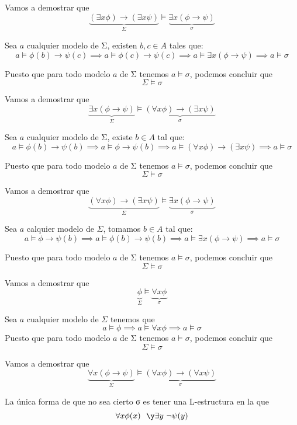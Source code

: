 \begin{problem}
\newpage

\spart
Vamos a demostrar que
\[\underbrace{(\exists x  \phi )\to  (\exists x \psi)}_{Σ} \models  \underbrace{\exists x (\phi \to \psi)}_{σ}\]

Sea $a$ cualquier modelo de Σ, existen $b,c \in A$ tales que:
\[a \models \phi(b) \to \psi(c) \implies a \models \phi(c) \to \psi(c) \implies a\models \exists x (\phi \to \psi) \implies a \models σ\]

Puesto que para todo modelo $a$ de Σ tenemos $a \models σ$, podemos concluir que
\[Σ \models σ\]

\spart

Vamos a demostrar que
\[\underbrace{\exists x (\phi \to \psi)}_{Σ} \models \underbrace{(\forall x  \phi ) \to  (\exists x \psi)}_{σ}\]

Sea $a$ cualquier modelo de Σ, existe $b \in A$ tal que:
\[a \models \phi(b) \to \psi(b) \implies a \models \phi \to \psi(b) \implies a\models  (\forall x \phi) \to (\exists x \psi) \implies a \models σ\]

Puesto que para todo modelo $a$ de Σ tenemos $a \models σ$, podemos concluir que
\[Σ \models σ\]

\spart

Vamos a demostrar que
\[\underbrace{(\forall x  \phi ) \to  (\exists x \psi)}_{Σ} \models \underbrace{ \exists x (\phi  \to \psi)}_{σ} \]

Sea $a$ calquier modelo de $Σ$, tomamos $b\in A$ tal que:
\[a \models \phi \to \psi(b) \implies a \models \phi(b) \to \psi (b) \implies a \models \exists x (\phi \to \psi) \implies a \models σ\]

Puesto que para todo modelo $a$ de Σ tenemos $a \models σ$, podemos concluir que
\[Σ \models σ\]

\spart

Vamos a demostrar que
\[\underbrace{ \phi }_{Σ} \models \underbrace{ \forall x \phi}_{σ}\]

Sea $a$ cualquier modelo de $Σ$ tenemos que
\[a \models \phi \implies a \models \forall x \phi \implies a \models σ\]
Puesto que para todo modelo $a$ de Σ tenemos $a \models σ$, podemos concluir que
\[Σ \models σ\]

\spart

Vamos a demostrar que
\[\underbrace{\forall x (\phi \to \psi)}_{Σ} \models \underbrace{(\forall x  \phi )\to  (\forall x \psi)}_{σ}\]

La única forma de que no sea cierto σ es tener una L-estructura en la que
\[\forall x \phi(x) \ \ \y \exists y \ \neg\psi(y)\]


\end{problem}
